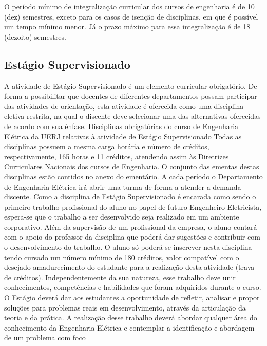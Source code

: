 O período mínimo de integralização curricular dos cursos de engenharia é de 10 (dez) semestres, exceto para os casos de isenção de disciplinas, em que é possível um tempo mínimo menor. Já o prazo máximo para essa integralização é de 18 (dezoito) semestres.


\subsection{Estágio Supervisionado}

A atividade de Estágio Supervisionado é um elemento curricular obrigatório. De forma a possibilitar que docentes de diferentes departamentos possam participar das atividades de orientação, esta atividade é oferecida como uma disciplina eletiva restrita, na qual o discente deve selecionar uma das alternativas oferecidas de acordo com sua ênfase.
Disciplinas obrigatórias do curso de Engenharia Elétrica da UERJ relativas à atividade de Estágio Supervisionado
Todas as disciplinas possuem a mesma carga horária e número de créditos, respectivamente, 165 horas e 11 créditos, atendendo assim às Diretrizes Curriculares Nacionais dos cursos de Engenharia. O conjunto das ementas destas disciplinas estão contidos no anexo do ementário. A cada período o Departamento de Engenharia Elétrica irá abrir uma turma de forma a atender a demanda discente.
Como a disciplina de Estágio Supervisionado é encarada como sendo o primeiro trabalho profissional do aluno no papel de futuro Engenheiro Eletricista, espera-se que o trabalho a ser desenvolvido seja realizado em um ambiente corporativo. Além da supervisão de um profissional da empresa, o aluno contará com o apoio do professor da disciplina que poderá dar sugestões e contribuir com o desenvolvimento do trabalho. O aluno só poderá se inscrever nesta disciplina tendo cursado um número mínimo de 180 créditos, valor compatível com o desejado amadurecimento do estudante para a realização desta atividade (trava de créditos).
Independentemente da sua natureza, esse trabalho deve unir conhecimentos, competências e habilidades que foram adquiridos durante o curso. O Estágio deverá dar aos estudantes a oportunidade de refletir, analisar e propor soluções para problemas reais em desenvolvimento, através da articulação da teoria e da prática. A realização desse trabalho deverá abordar qualquer área do conhecimento da Engenharia Elétrica e contemplar a identificação e abordagem de um problema com foco
